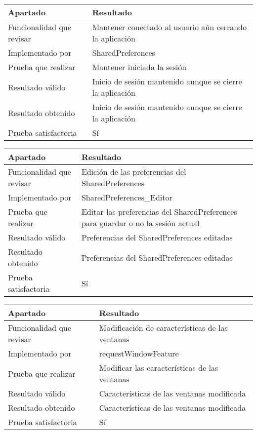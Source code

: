 \begin{center}
    \begin{tabulary}{0.8\textwidth}{L|L}
        \textbf{Apartado} & \textbf{Resultado} \\ \hline
        Funcionalidad que revisar & Mantener conectado al usuario aún cerrando la aplicación \\
        Implementado por & SharedPreferences \\
        Prueba que realizar & Mantener iniciada la sesión \\
        Resultado válido & Inicio de sesión mantenido aunque se cierre la aplicación \\
        Resultado obtenido & Inicio de sesión mantenido aunque se cierre la aplicación \\
        Prueba satisfactoria & Sí \\
    \end{tabulary}
\end{center}

\bigskip

\begin{center}
    \begin{tabulary}{0.8\textwidth}{L|L}
        \textbf{Apartado} & \textbf{Resultado} \\ \hline
        Funcionalidad que revisar & Edición de las preferencias del SharedPreferences \\
        Implementado por & SharedPreferences\_Editor \\
        Prueba que realizar & Editar las preferencias del SharedPreferences para guardar o no la sesión actual \\
        Resultado válido & Preferencias del SharedPreferences editadas \\
        Resultado obtenido & Preferencias del SharedPreferences editadas \\
        Prueba satisfactoria & Sí \\
    \end{tabulary}
\end{center}

\bigskip

\begin{center}
    \begin{tabulary}{0.8\textwidth}{L|L}
        \textbf{Apartado} & \textbf{Resultado} \\ \hline
        Funcionalidad que revisar & Modificación de características de las ventanas \\
        Implementado por & requestWindowFeature \\
        Prueba que realizar & Modificar las características de las ventanas \\
        Resultado válido & Características de las ventanas modificada \\
        Resultado obtenido & Características de las ventanas modificada \\
        Prueba satisfactoria & Sí \\
    \end{tabulary}
\end{center}

